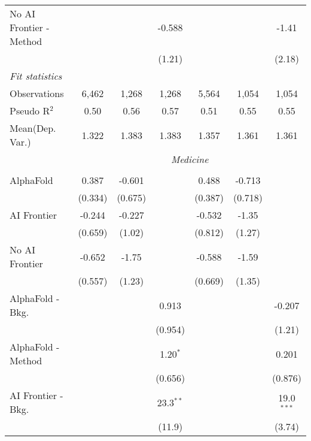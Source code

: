 \begin{tabular}{lcccccc}
   No AI Frontier - Method &               &              & -0.588       &               &              & -1.41\\   
                           &               &              & (1.21)       &               &              & (2.18)\\   
   \midrule
   \emph{Fit statistics}\\
   Observations            & 6,462         & 1,268        & 1,268        & 5,564         & 1,054        & 1,054\\  
   Pseudo R$^2$            & 0.50          & 0.56         & 0.57         & 0.51          & 0.55         & 0.55\\  
   
Mean(Dep. Var.) & 1.322 & 1.383 & 1.383 & 1.357 & 1.361 & 1.361 \\
 & \multicolumn{6}{c}{\textit{Medicine}} \\ \\
   AlphaFold               & 0.387   & -0.601  &               & 0.488   & -0.713  &   \\   
                           & (0.334) & (0.675) &               & (0.387) & (0.718) &   \\   
   AI Frontier             & -0.244  & -0.227  &               & -0.532  & -1.35   &   \\   
                           & (0.659) & (1.02)  &               & (0.812) & (1.27)  &   \\   
   No AI Frontier          & -0.652  & -1.75   &               & -0.588  & -1.59   &   \\   
                           & (0.557) & (1.23)  &               & (0.669) & (1.35)  &   \\   
   AlphaFold - Bkg.        &         &         & 0.913         &         &         & -0.207\\   
                           &         &         & (0.954)       &         &         & (1.21)\\   
   AlphaFold - Method      &         &         & 1.20$^{*}$    &         &         & 0.201\\   
                           &         &         & (0.656)       &         &         & (0.876)\\   
   AI Frontier - Bkg.      &         &         & 23.3$^{**}$   &         &         & 19.0$^{***}$\\   
                           &         &         & (11.9)        &         &         & (3.74)\\   

\end{tabular}
